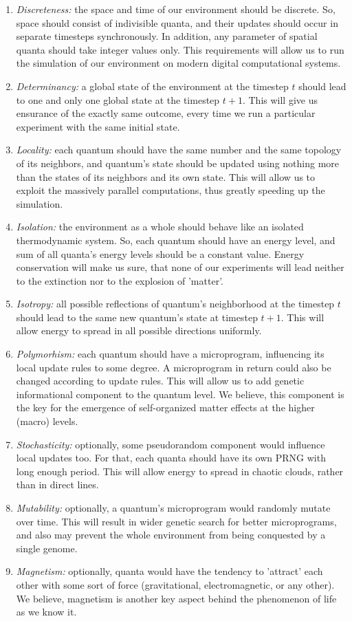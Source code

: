 \documentclass[a4paper,12pt,tikz,UTF8]{article}
\begin{document}
\begin{enumerate}
\begin{enumerate}
        \item \textit{Discreteness:} the space and time of our environment should be discrete. So, space should consist of indivisible quanta, and their updates should occur in separate timesteps synchronously. In addition, any parameter of spatial quanta should take integer values only. This requirements will allow us to run the simulation of our environment on modern digital computational systems.
        \item \textit{Determinancy:} a global state of the environment at the timestep $t$ should lead to one and only one global state at the timestep $t + 1$. This will give us ensurance of the exactly same outcome, every time we run a particular experiment with the same initial state.
        \item \textit{Locality:} each quantum should have the same number and the same topology of its neighbors, and quantum's state should be updated using nothing more than the states of its neighbors and its own state. This will allow us to exploit the massively parallel computations, thus greatly speeding up the simulation.
        \item \label{itm:isolation} \textit{Isolation:} the environment as a whole should behave like an isolated thermodynamic system. So, each quantum should have an energy level, and sum of all quanta's energy levels should be a constant value. Energy conservation will make us sure, that none of our experiments will lead neither to the extinction nor to the explosion of 'matter'.
        \item \textit{Isotropy:} all possible reflections of quantum's neighborhood at the timestep $t$ should lead to the same new quantum's state at timestep $t + 1$. This will allow energy to spread in all possible directions uniformly. 
        \item \textit{Polymorhism:} each quantum should have a microprogram, influencing its local update rules to some degree. A microprogram in return could also be changed according to update rules. This will allow us to add genetic informational component to the quantum level. We believe, this component is the key for the emergence of self-organized matter effects at the higher (macro) levels.
        \item \textit{Stochasticity:} optionally, some pseudorandom component would influence local updates too. For that, each quanta should have its own PRNG with long enough period. This will allow energy to spread in chaotic clouds, rather than in direct lines.
        \item \textit{Mutability:} optionally, a quantum's microprogram would randomly mutate over time. This will result in wider genetic search for better microprograms, and also may prevent the whole environment from being conquested by a single genome.
        \item \textit{Magnetism:} optionally, quanta would have the tendency to 'attract' each other with some sort of force (gravitational, electromagnetic, or any other). We believe, magnetism is another key aspect behind the phenomenon of life as we know it.
      \end{enumerate}


\end{enumerate}
\end{document}
